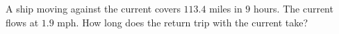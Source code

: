 A ship moving against the current covers $113.4$ miles in $9$ hours. The current flows at $1.9$ mph. How long does the return trip with the current take?
